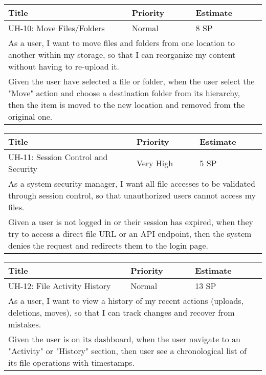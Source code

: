 \vspace{5mm}
\begin{tabular}{|p{4cm}|p{5cm}|p{5cm}|}
    \hline
    \textbf{Title} & \textbf{Priority} & \textbf{Estimate} \\
    \hline
    UH-10: Move Files/Folders & Normal & 8 SP \\
    \hline
    \multicolumn{3}{|p{14cm}|}{As a user, I want to move files and folders from one location to another within my storage, so that I can reorganize my content without having to re-upload it.} \\
    \hline
    \multicolumn{3}{|p{14cm}|}{Given the user have selected a file or folder, when the user select the "Move" action and choose a destination folder from its hierarchy, then the item is moved to the new location and removed from the original one.} \\
    \hline
\end{tabular}

\vspace{5mm}
\begin{tabular}{|p{4cm}|p{5cm}|p{5cm}|}
    \hline
    \textbf{Title} & \textbf{Priority} & \textbf{Estimate} \\
    \hline
    UH-11: Session Control and Security & Very High & 5 SP \\
    \hline
    \multicolumn{3}{|p{14cm}|}{As a system security manager, I want all file accesses to be validated through session control, so that unauthorized users cannot access my files.} \\
    \hline
    \multicolumn{3}{|p{14cm}|}{Given a user is not logged in or their session has expired, when they try to access a direct file URL or an API endpoint, then the system denies the request and redirects them to the login page.} \\
    \hline
\end{tabular}

\vspace{5mm}
\begin{tabular}{|p{4cm}|p{5cm}|p{5cm}|}
    \hline
    \textbf{Title} & \textbf{Priority} & \textbf{Estimate} \\
    \hline
    UH-12: File Activity History & Normal & 13 SP \\
    \hline
    \multicolumn{3}{|p{14cm}|}{As a user, I want to view a history of my recent actions (uploads, deletions, moves), so that I can track changes and recover from mistakes.} \\
    \hline
    \multicolumn{3}{|p{14cm}|}{Given the user is on its dashboard, when the user navigate to an "Activity" or "History" section, then user see a chronological list of its file operations with timestamps.} \\
    \hline
\end{tabular}

